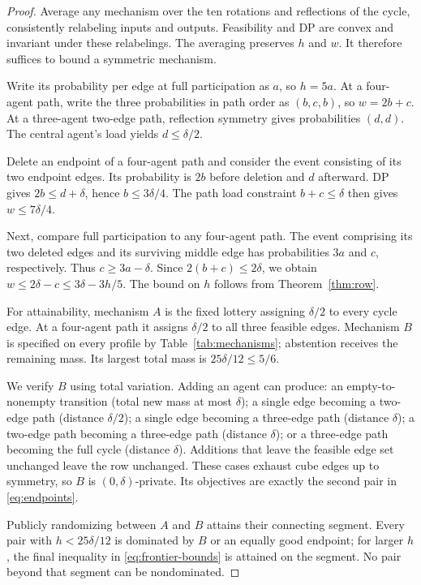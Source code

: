 \documentclass[sigconf,nonacm]{aamas}
\begin{document}
\begin{proof}
Average any mechanism over the ten rotations and reflections of the cycle, consistently relabeling inputs and outputs. Feasibility and DP are convex and invariant under these relabelings. The averaging preserves $h$ and $w$. It therefore suffices to bound a symmetric mechanism.

Write its probability per edge at full participation as $a$, so $h=5a$. At a four-agent path, write the three probabilities in path order as $(b,c,b)$, so $w=2b+c$. At a three-agent two-edge path, reflection symmetry gives probabilities $(d,d)$. The central agent's load yields $d\leq\delta/2$.

Delete an endpoint of a four-agent path and consider the event consisting of its two endpoint edges. Its probability is $2b$ before deletion and $d$ afterward. DP gives $2b\leq d+\delta$, hence $b\leq3\delta/4$. The path load constraint $b+c\leq\delta$ then gives $w\leq7\delta/4$.

Next, compare full participation to any four-agent path. The event comprising its two deleted edges and its surviving middle edge has probabilities $3a$ and $c$, respectively. Thus $c\geq3a-\delta$. Since $2(b+c)\leq2\delta$, we obtain $w\leq2\delta-c\leq3\delta-3h/5$. The bound on $h$ follows from Theorem~\ref{thm:row}.

For attainability, mechanism $A$ is the fixed lottery assigning $\delta/2$ to every cycle edge. At a four-agent path it assigns $\delta/2$ to all three feasible edges. Mechanism $B$ is specified on every profile by Table~\ref{tab:mechanisms}; abstention receives the remaining mass. Its largest total mass is $25\delta/12\leq5/6$.

We verify $B$ using total variation. Adding an agent can produce: an empty-to-nonempty transition (total new mass at most $\delta$); a single edge becoming a two-edge path (distance $\delta/2$); a single edge becoming a three-edge path (distance $\delta$); a two-edge path becoming a three-edge path (distance $\delta$); or a three-edge path becoming the full cycle (distance $\delta$). Additions that leave the feasible edge set unchanged leave the row unchanged. These cases exhaust cube edges up to symmetry, so $B$ is $(0,\delta)$-private. Its objectives are exactly the second pair in \eqref{eq:endpoints}.

Publicly randomizing between $A$ and $B$ attains their connecting segment. Every pair with $h<25\delta/12$ is dominated by $B$ or an equally good endpoint; for larger $h$, the final inequality in \eqref{eq:frontier-bounds} is attained on the segment. No pair beyond that segment can be nondominated.
\end{proof}
\end{document}
